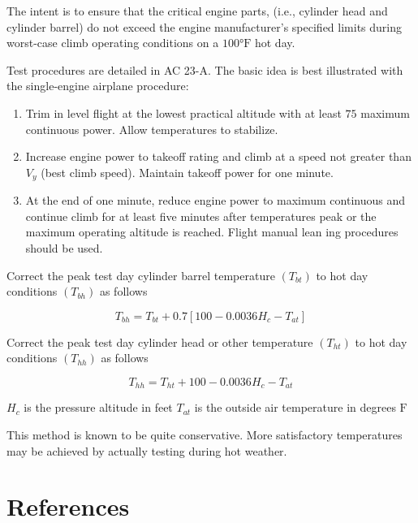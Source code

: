 \documentclass[
]{book}
\providecommand{\tightlist}{%
  \setlength{\itemsep}{0pt}\setlength{\parskip}{0pt}}
\begin{document}
The intent is to ensure that the critical engine parts, (i.e., cylinder head and cylinder barrel) do not exceed the engine manufacturer's specified limits during worst-case climb operating conditions on a \(100° \text{F}\) hot day.

Test procedures are detailed in AC 23-A. The basic idea is best illustrated with the single-engine airplane procedure:

\begin{enumerate}
\def\labelenumi{\arabic{enumi}.}
\tightlist
\item
  Trim in level flight at the lowest practical altitude with at least \(75%
  \) maximum continuous power. Allow temperatures to stabilize.
\item
  Increase engine power to takeoff rating and climb at a speed not greater than \(V_y\) (best climb speed). Maintain takeoff power for one minute.
\item
  At the end of one minute, reduce engine power to maximum continuous and continue climb for at least five minutes after temperatures peak or the maximum operating altitude is reached. Flight manual lean ing procedures should be used.
\end{enumerate}

Correct the peak test day cylinder barrel temperature \(\left( T_{bt} \right)\) to hot day conditions \(\left( T_{bh} \right)\) as follows

\[
T_{bh} = T_{bt} +0.7 \left[ 100 - 0.0036 H_c - T_{at} \right]
\]

Correct the peak test day cylinder head or other temperature \(\left( T_{ht} \right)\) to hot day conditions \(\left( T_{hh} \right)\) as follows

\[
T_{hh} = T_{ht} + 100 - 0.0036 H_c - T_{at}
\]

\(H_c\) is the pressure altitude in feet
\(T_{at}\) is the outside air temperature in degrees \(\text{F}\)

This method is known to be quite conservative. More satisfactory temperatures may be achieved by actually testing during hot weather.

\hypertarget{references}{%
\section{References}\label{references}}
\end{document}
